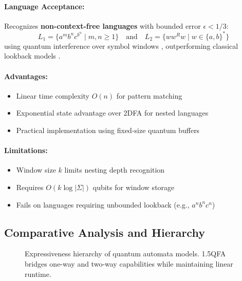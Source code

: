 \paragraph{Language Acceptance:}
Recognizes \textbf{non-context-free languages} with bounded error $\epsilon < 1/3$:
\[
L_1 = \{a^mb^nc^{b^n} \mid m,n \geq 1\} \quad \text{and} \quad L_2 = \{ww^Rw \mid w \in \{a,b\}^*\} 
\]
using quantum interference over symbol windows \cite{ambainis1998}, outperforming classical lookback models \cite{moore1971}.

\paragraph{Advantages:}
\begin{itemize}
    \item Linear time complexity $O(n)$ for pattern matching
    \item Exponential state advantage over 2DFA for nested languages
    \item Practical implementation using fixed-size quantum buffers
\end{itemize}

\paragraph{Limitations:}
\begin{itemize}
    \item Window size $k$ limits nesting depth recognition
    \item Requires $O(k\log|\Sigma|)$ qubits for window storage
    \item Fails on languages requiring unbounded lookback (e.g., $a^nb^nc^n$)
\end{itemize}

\subsection*{Comparative Analysis and Hierarchy}
\begin{figure}[h]
\centering
{}
\caption{Expressiveness hierarchy of quantum automata models. 1.5QFA bridges one-way and two-way capabilities while maintaining linear runtime.}
\label{fig:1.5qfa-hierarchy}
\end{figure}

